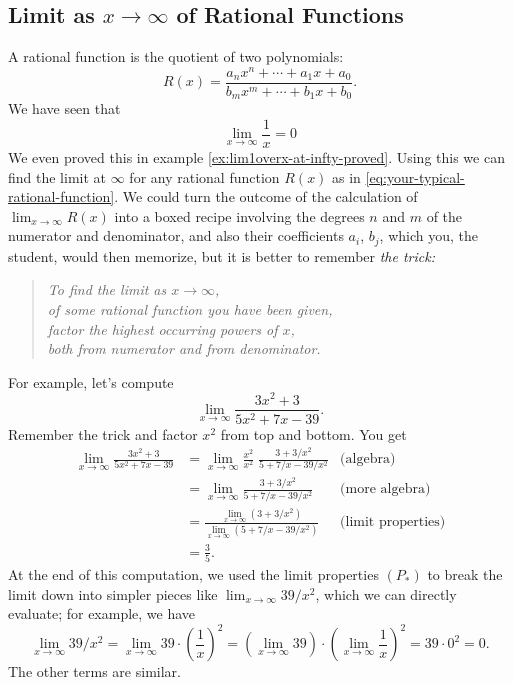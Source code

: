 \subsection{Limit as $x\to\infty$ of Rational Functions} 
\label{sec:lim-at-infty-of-rationalfunction}%
A rational function is the quotient of two polynomials:
\begin{equation}\label{eq:your-typical-rational-function}
  R(x) = \frac{a_nx^n+\cdots +a_1x+a_0}{b_mx^m+\cdots+b_1x+b_0}.
\end{equation}
We have seen that
\[
\lim_{x\to\infty} \frac 1x =0
\]
We even proved this in example \ref{ex:lim1overx-at-infty-proved}.  Using
this we can find the limit at $\infty$ for any rational function $R(x)$ as
in \eqref{eq:your-typical-rational-function}.  We could turn the outcome
of the calculation of $\lim_{x\to\infty}R(x)$ into a boxed recipe
involving the degrees $n$ and $m$ of the numerator and denominator, and
also their coefficients $a_i$, $b_j$, which you, the student, would then memorize,
but it is better to remember {\itshape the trick:}
\begin{verse}\itshape
  To find the limit as $x\to\infty$,\\
  of some rational function you have been given,\\
  factor the highest occurring powers of $x$,\\
  both from numerator and from denominator.
\end{verse}
For example, let's compute
\[
\lim_{x\to\infty}\frac{3x^2+3}{5x^2+7x-39}.
\]
Remember the trick and factor $x^2$ from top and bottom. You get
\begin{align*}
  \lim_{x\to\infty}\frac{3x^2+3}{5x^2+7x-39}
  &= \lim_{x\to\infty}\frac{x^2}{x^2} \; \frac{3+3/x^2}{5+7/x-39/x^2}
  & \text{(algebra)}\\
  &= \lim_{x\to\infty}\frac{3+3/x^2}{5+7/x-39/x^2}& \text{(more algebra)}\\
  &= \frac{\lim_{x\to\infty}(3+3/x^2)}{\lim_{x\to\infty}(5+7/x-39/x^2)}
  &\text{(limit properties)}\\
  &= \frac35.
\end{align*}
At the end of this computation, we used the limit properties
$(P_\ast)$ to break the limit down into simpler pieces like
$\lim_{x\to\infty}39/x^2$, which we can directly evaluate; for example, we have
\[
\lim_{x\to\infty} 39/x^2 =\lim_{x\to\infty} 39\cdot \left( \frac1x
\right)^2 = \left( \lim_{x\to\infty}39\right)\cdot \left(
  \lim_{x\to\infty}\frac1x \right)^2 = 39 \cdot 0^2 =0.
\]
  The other terms are similar.
  
